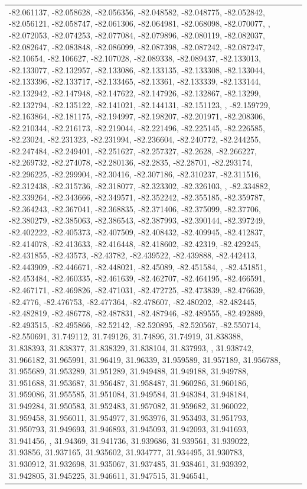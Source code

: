 \documentclass[
]{book}
\begin{document}
\begin{table}[ht]
\begin{centerbox}
\begin{threeparttable}
\begin{tabular}{l l l}
-82.061137, -82.058628, -82.056356, -82.048582, -82.048775, -82.052842, -82.056121, -82.058747, -82.061306, -82.064981, -82.068098, -82.070077,  \newline -82.072024, -82.072053, -82.074253, -82.077084, -82.079896, -82.080119, -82.082037, -82.082647, -82.083848, -82.086099, -82.087398, -82.087242, -82.087247, -82.10654, -82.106627, -82.107028, -82.089338, -82.089437, -82.133013, -82.133077, -82.132957, -82.133086, -82.133135, -82.133308, -82.133044, -82.133396, -82.133717, -82.133465, -82.13361, -82.133339, -82.133144, -82.132942, -82.147948, -82.147622, -82.147926, -82.132867, -82.13299, -82.132794, -82.135122, -82.141021, -82.144131, -82.151123,  \newline -82.155075, -82.159729, -82.163864, -82.181175, -82.194997, -82.198207, -82.201971, -82.208306, -82.210344, -82.216173, -82.219044, -82.221496, -82.225145, -82.226585, -82.23024, -82.231323, -82.231994, -82.236604, -82.240772, -82.244255, -82.247484, -82.249401, -82.251627, -82.257327, -82.2628, -82.266227, -82.269732, -82.274078, -82.280136, -82.2835, -82.28701, -82.293174, -82.296225, -82.299904, -82.30416, -82.307186, -82.310237, -82.311516, -82.312438, -82.315736, -82.318077, -82.323302, -82.326103,  \newline -82.327446, -82.334882, -82.339264, -82.343666, -82.349571, -82.352242, -82.355185, -82.359787, -82.364243, -82.367041, -82.368835, -82.371406, -82.375099, -82.37706, -82.380279, -82.385063, -82.386543, -82.387993, -82.390144, -82.397249, -82.402222, -82.405373, -82.407509, -82.408432, -82.409945, -82.412837, -82.414078, -82.413633, -82.416448, -82.418602, -82.42319, -82.429245, -82.431855, -82.43573, -82.43782, -82.439522, -82.439888, -82.442413, -82.443909, -82.446671, -82.448021, -82.45089, -82.451584,  \newline -82.451187, -82.451851, -82.453484, -82.460335, -82.461639, -82.462707, -82.464195, -82.466591, -82.467171, -82.469826, -82.471031, -82.472725, -82.473839, -82.476639, -82.4776, -82.476753, -82.477364, -82.478607, -82.480202, -82.482445, -82.482819, -82.486778, -82.487831, -82.487946, -82.489555, -82.492889, -82.493515, -82.495866, -82.52142, -82.520895, -82.520567, -82.550714, -82.550691, 31.749112, 31.749126, 31.74896, 31.74919, 31.838388, 31.838393, 31.838377, 31.838329, 31.838104, 31.837993,  \newline 31.844374, 31.938742, 31.966182, 31.965991, 31.96419, 31.96339, 31.959589, 31.957189, 31.956788, 31.955689, 31.953289, 31.951289, 31.949488, 31.949188, 31.949788, 31.951688, 31.953687, 31.956487, 31.958487, 31.960286, 31.960186, 31.959086, 31.955585, 31.951084, 31.949584, 31.948384, 31.948184, 31.949284, 31.950583, 31.952483, 31.957082, 31.959682, 31.960022, 31.959458, 31.956011, 31.954977, 31.953976, 31.953493, 31.951793, 31.950793, 31.949693, 31.946893, 31.945093, 31.942093, 31.941693, 31.941456,  \newline 31.943641, 31.94369, 31.941736, 31.939686, 31.939561, 31.939022, 31.93856, 31.937165, 31.935602, 31.934777, 31.934495, 31.930783, 31.930912, 31.932698, 31.935067, 31.937485, 31.938461, 31.939392, 31.942805, 31.945225, 31.946611, 31.947515, 31.946541, 
\end{tabular}
\end{threeparttable}
\end{centerbox}
\end{table}
\end{document}
